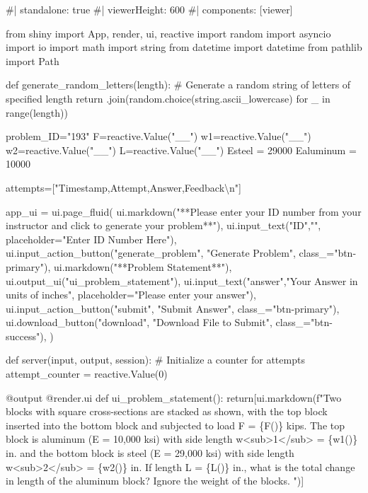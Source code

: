 \documentclass[
  letterpaper,
  DIV=11,
  numbers=noendperiod]{scrreprt}
\newenvironment{Shaded}{\begin{snugshade}}{\end{snugshade}}
\newcommand{\NormalTok}[1]{\textcolor[rgb]{0.00,0.23,0.31}{#1}}
\begin{document}
\begin{Shaded}
\begin{Highlighting}[]
\NormalTok{\#| standalone: true}
\NormalTok{\#| viewerHeight: 600}
\NormalTok{\#| components: [viewer]}

\NormalTok{from shiny import App, render, ui, reactive}
\NormalTok{import random}
\NormalTok{import asyncio}
\NormalTok{import io}
\NormalTok{import math}
\NormalTok{import string}
\NormalTok{from datetime import datetime}
\NormalTok{from pathlib import Path}

\NormalTok{def generate\_random\_letters(length):}
\NormalTok{    \# Generate a random string of letters of specified length}
\NormalTok{    return \textquotesingle{}\textquotesingle{}.join(random.choice(string.ascii\_lowercase) for \_ in range(length)) }

\NormalTok{problem\_ID="193"}
\NormalTok{F=reactive.Value("\_\_")}
\NormalTok{w1=reactive.Value("\_\_")}
\NormalTok{w2=reactive.Value("\_\_")}
\NormalTok{L=reactive.Value("\_\_")}
\NormalTok{Esteel = 29000}
\NormalTok{Ealuminum = 10000}



\NormalTok{attempts=["Timestamp,Attempt,Answer,Feedback\textbackslash{}n"]}

\NormalTok{app\_ui = ui.page\_fluid(}
\NormalTok{    ui.markdown("**Please enter your ID number from your instructor and click to generate your problem**"),}
\NormalTok{    ui.input\_text("ID","", placeholder="Enter ID Number Here"),}
\NormalTok{    ui.input\_action\_button("generate\_problem", "Generate Problem", class\_="btn{-}primary"),}
\NormalTok{    ui.markdown("**Problem Statement**"),}
\NormalTok{    ui.output\_ui("ui\_problem\_statement"),}
\NormalTok{    ui.input\_text("answer","Your Answer in units of inches", placeholder="Please enter your answer"),}
\NormalTok{    ui.input\_action\_button("submit", "Submit Answer", class\_="btn{-}primary"),}
\NormalTok{    ui.download\_button("download", "Download File to Submit", class\_="btn{-}success"),}
\NormalTok{)}


\NormalTok{def server(input, output, session):}
\NormalTok{    \# Initialize a counter for attempts}
\NormalTok{    attempt\_counter = reactive.Value(0)}

\NormalTok{    @output}
\NormalTok{    @render.ui}
\NormalTok{    def ui\_problem\_statement():}
\NormalTok{        return[ui.markdown(f"Two blocks with square cross{-}sections are stacked as shown, with the top block inserted into the bottom block and subjected to load F = \{F()\} kips. The top block is aluminum (E = 10,000 ksi) with side length w\textless{}sub\textgreater{}1\textless{}/sub\textgreater{} = \{w1()\} in.  and the bottom block is steel (E = 29,000 ksi) with side length w\textless{}sub\textgreater{}2\textless{}/sub\textgreater{} = \{w2()\} in. If length L = \{L()\} in., what is the total change in length of the aluminum block? Ignore the weight of the blocks. ")]}
    

\end{Highlighting}
\end{Shaded}
\end{document}
